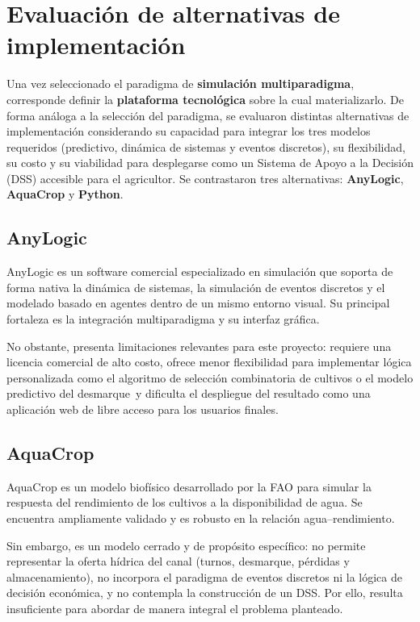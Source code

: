 \documentclass[12pt]{report}
\begin{document}
\section{Evaluación de alternativas de implementación}

Una vez seleccionado el paradigma de \textbf{simulación multiparadigma}, corresponde definir la \textbf{plataforma tecnológica} sobre la cual materializarlo. De forma análoga a la selección del paradigma, se evaluaron distintas alternativas de implementación considerando su capacidad para integrar los tres modelos requeridos (predictivo, dinámica de sistemas y eventos discretos), su flexibilidad, su costo y su viabilidad para desplegarse como un Sistema de Apoyo a la Decisión (DSS) accesible para el agricultor. Se contrastaron tres alternativas: \textbf{AnyLogic}, \textbf{AquaCrop} y \textbf{Python}.

\subsection{AnyLogic}

AnyLogic es un software comercial especializado en simulación que soporta de forma nativa la dinámica de sistemas, la simulación de eventos discretos y el modelado basado en agentes dentro de un mismo entorno visual. Su principal fortaleza es la integración multiparadigma y su interfaz gráfica.

No obstante, presenta limitaciones relevantes para este proyecto: requiere una licencia comercial de alto costo, ofrece menor flexibilidad para implementar lógica personalizada \textemdash como el algoritmo de selección combinatoria de cultivos o el modelo predictivo del desmarque\textemdash\ y dificulta el despliegue del resultado como una aplicación web de libre acceso para los usuarios finales.

\subsection{AquaCrop}

AquaCrop es un modelo biofísico desarrollado por la FAO para simular la respuesta del rendimiento de los cultivos a la disponibilidad de agua. Se encuentra ampliamente validado y es robusto en la relación agua--rendimiento.

Sin embargo, es un modelo cerrado y de propósito específico: no permite representar la oferta hídrica del canal (turnos, desmarque, pérdidas y almacenamiento), no incorpora el paradigma de eventos discretos ni la lógica de decisión económica, y no contempla la construcción de un DSS. Por ello, resulta insuficiente para abordar de manera integral el problema planteado.
\end{document}
